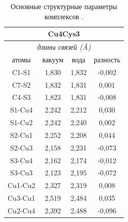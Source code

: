 \documentclass[a4paper,12pt]{article}
\begin{document}
\begin{onehalfspace}
	
	\begin{table}[H]
		\caption{Основные структурные параметры комплексов .}
		\label{tab6}
		\centering
		\begin{tabular}{|cccc|}
			\hline
			\multicolumn{4}{|c|}{\textbf{Cu4Cys3}}                                                              \\ \hline
			\multicolumn{4}{|c|}{\textit{длины связей (Å)}}                                                     \\ \hline
			\multicolumn{1}{|c|}{атомы}   & \multicolumn{1}{c|}{вакуум} & \multicolumn{1}{c|}{вода}  & разность \\ \hline
			\multicolumn{1}{|c|}{C1-S1}   & \multicolumn{1}{c|}{1,830}  & \multicolumn{1}{c|}{1,832} & -0,002   \\ \hline
			\multicolumn{1}{|c|}{C7-S2}   & \multicolumn{1}{c|}{1,832}  & \multicolumn{1}{c|}{1,831} & 0,001    \\ \hline
			\multicolumn{1}{|c|}{C4-S3}   & \multicolumn{1}{c|}{1,823}  & \multicolumn{1}{c|}{1,831} & -0,008   \\ \hline
			\multicolumn{1}{|c|}{S1-Cu4}  & \multicolumn{1}{c|}{2,242}  & \multicolumn{1}{c|}{2,212} & 0,030    \\ \hline
			\multicolumn{1}{|c|}{S1-Cu2}  & \multicolumn{1}{c|}{2,242}  & \multicolumn{1}{c|}{2,240} & 0,002    \\ \hline
			\multicolumn{1}{|c|}{S2-Cu1}  & \multicolumn{1}{c|}{2,252}  & \multicolumn{1}{c|}{2,208} & 0,044    \\ \hline
			\multicolumn{1}{|c|}{S2-Cu3}  & \multicolumn{1}{c|}{2,158}  & \multicolumn{1}{c|}{2,231} & -0,073   \\ \hline
			\multicolumn{1}{|c|}{S3-Cu4}  & \multicolumn{1}{c|}{2,162}  & \multicolumn{1}{c|}{2,174} & -0,012   \\ \hline
			\multicolumn{1}{|c|}{S3-Cu3}  & \multicolumn{1}{c|}{2,123}  & \multicolumn{1}{c|}{2,195} & -0,072   \\ \hline
			\multicolumn{1}{|c|}{Cu1-Cu2} & \multicolumn{1}{c|}{2,327}  & \multicolumn{1}{c|}{2,319} & 0,008    \\ \hline
			\multicolumn{1}{|c|}{Cu3-Cu1} & \multicolumn{1}{c|}{2,519}  & \multicolumn{1}{c|}{2,484} & 0,035    \\ \hline
			\multicolumn{1}{|c|}{Cu2-Cu4} & \multicolumn{1}{c|}{2,392}  & \multicolumn{1}{c|}{2,488} & -0,096   \\ \hline
		\end{tabular}
	\end{table}
	

\end{onehalfspace}
\end{document}
